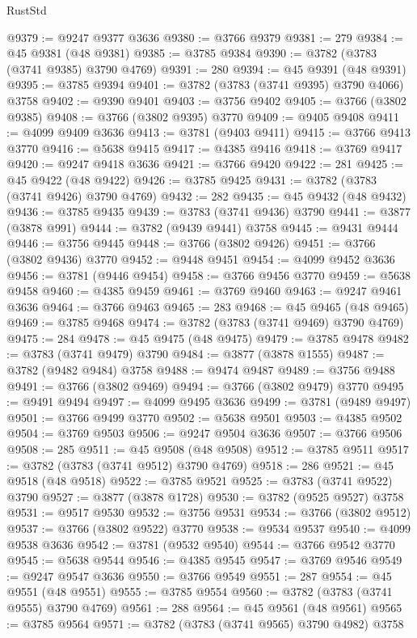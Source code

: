 \begin{lexlean}{RustStd}
\begin{coremodule}
@9379 := @9247 @9377 @3636
@9380 := @3766 @9379
@9381 := 279
@9384 := @45 @9381 (@48 @9381)
@9385 := @3785 @9384
@9390 := @3782 (@3783 (@3741 @9385) @3790 @4769)
@9391 := 280
@9394 := @45 @9391 (@48 @9391)
@9395 := @3785 @9394
@9401 := @3782 (@3783 (@3741 @9395) @3790 @4066) @3758
@9402 := @9390 @9401
@9403 := @3756 @9402
@9405 := @3766 (@3802 @9385)
@9408 := @3766 (@3802 @9395) @3770
@9409 := @9405 @9408
@9411 := @4099 @9409 @3636
@9413 := @3781 (@9403 @9411)
@9415 := @3766 @9413 @3770
@9416 := @5638 @9415
@9417 := @4385 @9416
@9418 := @3769 @9417
@9420 := @9247 @9418 @3636
@9421 := @3766 @9420
@9422 := 281
@9425 := @45 @9422 (@48 @9422)
@9426 := @3785 @9425
@9431 := @3782 (@3783 (@3741 @9426) @3790 @4769)
@9432 := 282
@9435 := @45 @9432 (@48 @9432)
@9436 := @3785 @9435
@9439 := @3783 (@3741 @9436) @3790
@9441 := @3877 (@3878 @991)
@9444 := @3782 (@9439 @9441) @3758
@9445 := @9431 @9444
@9446 := @3756 @9445
@9448 := @3766 (@3802 @9426)
@9451 := @3766 (@3802 @9436) @3770
@9452 := @9448 @9451
@9454 := @4099 @9452 @3636
@9456 := @3781 (@9446 @9454)
@9458 := @3766 @9456 @3770
@9459 := @5638 @9458
@9460 := @4385 @9459
@9461 := @3769 @9460
@9463 := @9247 @9461 @3636
@9464 := @3766 @9463
@9465 := 283
@9468 := @45 @9465 (@48 @9465)
@9469 := @3785 @9468
@9474 := @3782 (@3783 (@3741 @9469) @3790 @4769)
@9475 := 284
@9478 := @45 @9475 (@48 @9475)
@9479 := @3785 @9478
@9482 := @3783 (@3741 @9479) @3790
@9484 := @3877 (@3878 @1555)
@9487 := @3782 (@9482 @9484) @3758
@9488 := @9474 @9487
@9489 := @3756 @9488
@9491 := @3766 (@3802 @9469)
@9494 := @3766 (@3802 @9479) @3770
@9495 := @9491 @9494
@9497 := @4099 @9495 @3636
@9499 := @3781 (@9489 @9497)
@9501 := @3766 @9499 @3770
@9502 := @5638 @9501
@9503 := @4385 @9502
@9504 := @3769 @9503
@9506 := @9247 @9504 @3636
@9507 := @3766 @9506
@9508 := 285
@9511 := @45 @9508 (@48 @9508)
@9512 := @3785 @9511
@9517 := @3782 (@3783 (@3741 @9512) @3790 @4769)
@9518 := 286
@9521 := @45 @9518 (@48 @9518)
@9522 := @3785 @9521
@9525 := @3783 (@3741 @9522) @3790
@9527 := @3877 (@3878 @1728)
@9530 := @3782 (@9525 @9527) @3758
@9531 := @9517 @9530
@9532 := @3756 @9531
@9534 := @3766 (@3802 @9512)
@9537 := @3766 (@3802 @9522) @3770
@9538 := @9534 @9537
@9540 := @4099 @9538 @3636
@9542 := @3781 (@9532 @9540)
@9544 := @3766 @9542 @3770
@9545 := @5638 @9544
@9546 := @4385 @9545
@9547 := @3769 @9546
@9549 := @9247 @9547 @3636
@9550 := @3766 @9549
@9551 := 287
@9554 := @45 @9551 (@48 @9551)
@9555 := @3785 @9554
@9560 := @3782 (@3783 (@3741 @9555) @3790 @4769)
@9561 := 288
@9564 := @45 @9561 (@48 @9561)
@9565 := @3785 @9564
@9571 := @3782 (@3783 (@3741 @9565) @3790 @4982) @3758

\end{coremodule}
\end{lexlean}
